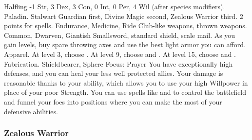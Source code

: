              Halfling
             -1 Str, 3 Dex, 3 Con, 0 Int, 0 Per, 4 Wil (after species modifiers).
             Paladin.
             Stalwart Guardian first, Divine Magic second, Zealous Warrior third.
             2 points for spells.
             Endurance, Medicine, Ride
             Club-like weapons, thrown weapons.
             Common, Dwarven, Giantish
             Smallsword, standard shield, scale mail. As you gain levels, buy spare throwing axes and use the best light armor you can afford.
             Apparel.
                At level 3, choose .
                At level 9, choose  and .
                At level 15, choose  and .
             Fabrication.
             Shieldbearer, Sphere Focus: Prayer
             You have exceptionally high defenses, and you can heal your less well protected allies.
            Your damage is reasonable thanks to your  ability, which allows you to use your high Willpower in place of your poor Strength.
            You can use spells like  and  to control the battlefield and funnel your foes into positions where you can make the most of your defensive abilities.

        \subsubsection{Zealous Warrior}

